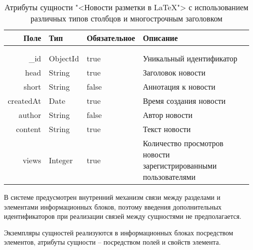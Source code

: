 \begin{xltabular}{\textwidth}{|R|C{2.5cm}|l|T|}
	\caption{Атрибуты  сущности "<Новости разметки в LaTeX"> с использованием различных типов столбцов и многострочным заголовком\label{prod:table}}\\ \hline
	\centrow Поле & \centrow Тип & \centrow Обязательное & \centrow Описание \\ \hline
	 &  &  &  \\ \hline
	\endfirsthead
	 &  &  &  \\ \hline
	\finishhead
	\_id & ObjectId & true & Уникальный идентификатор \\ \hline 
	head & String & true & Заголовок новости \\ \hline 
	short & String & false & Аннотация к новости \\ \hline 
	createdAt & Date & true & Время создания новости \\ \hline 
	author & String & false & Автор новости \\ \hline 
	content & String & true & Текст новости \\ \hline 
	views & Integer & true & Количество просмотров новости зарегистрированными пользователями
\end{xltabular}

В системе предусмотрен внутренний механизм связи между разделами и элементами информационных блоков, поэтому введения дополнительных идентификаторов при реализации связей между сущностями не предполагается.

Экземпляры сущностей реализуются в информационных блоках посредством элементов, атрибуты сущности – посредством полей и свойств элемента. 
